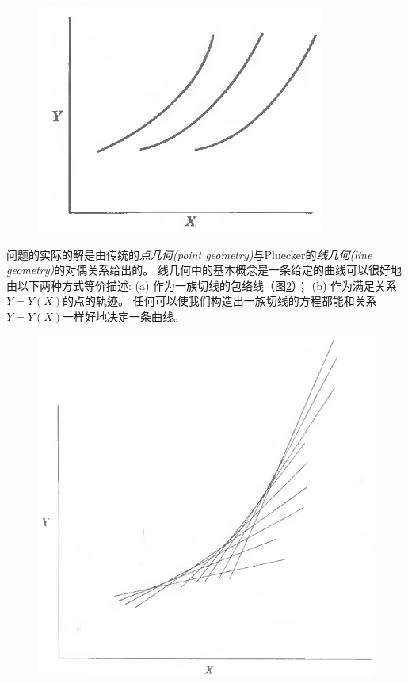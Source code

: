 \begin{figure}[htbp]
\includegraphics[width=\textwidth]{Pictures/fig5.4.png}
\figcaption{}
\label{fig5.4}
\end{figure}

问题的实际的解是由传统的{\it 点几何(point geometry)}与Pluecker的{\it 线几何(line geometry)}的对偶关系给出的。
线几何中的基本概念是一条给定的曲线可以很好地由以下两种方式等价描述:
(a) 作为一族切线的包络线（图\ref{fig5.5}）；
(b) 作为满足关系$Y=Y(X)$的点的轨迹。
任何可以使我们构造出一族切线的方程都能和关系$Y=Y(X)$一样好地决定一条曲线。

\begin{figure}
\includegraphics[width=\textwidth]{Pictures/fig5.5.png}
\figcaption{}
\label{fig5.5}
\end{figure}

